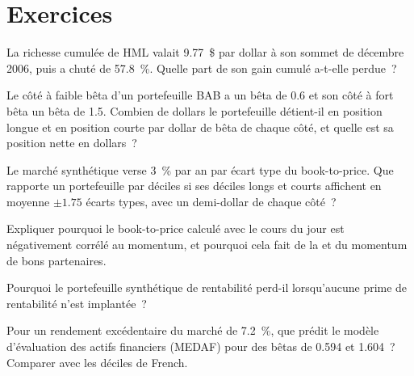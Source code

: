 \section{Exercices}

\begin{exercise}[$\star$]\label{exo:s1:value-quality-and-low-risk:1}
La richesse cumulée de HML valait 9.77~\$ par dollar à son sommet de décembre 2006, puis a chuté de 57.8~\%. Quelle part de son gain cumulé a-t-elle perdue~?
\end{exercise}

\begin{exercise}[$\star$]\label{exo:s1:value-quality-and-low-risk:2}
Le côté à faible bêta d'un portefeuille BAB a un bêta de 0.6 et son côté à fort bêta un bêta de 1.5. Combien de dollars le portefeuille détient-il en position longue et en position courte par dollar de bêta de chaque côté, et
quelle est sa position nette en dollars~?
\end{exercise}

\begin{exercise}[$\star$]\label{exo:s1:value-quality-and-low-risk:3}
Le marché synthétique verse 3~\% par an par écart type du book-to-price. Que rapporte un portefeuille par déciles si ses déciles longs et courts affichent en moyenne $\pm 1.75$
écarts types, avec un demi-dollar de chaque côté~?
\end{exercise}

\begin{exercise}[$\star\star$]\label{exo:s1:value-quality-and-low-risk:4}
Expliquer pourquoi le book-to-price calculé avec le cours du jour est négativement corrélé au momentum, et pourquoi cela fait de la  et du momentum de bons partenaires.
\end{exercise}

\begin{exercise}[$\star\star$]\label{exo:s1:value-quality-and-low-risk:5}
Pourquoi le portefeuille synthétique de rentabilité perd-il lorsqu'aucune prime de rentabilité n'est implantée~?
\end{exercise}

\begin{exercise}[$\star\star$]\label{exo:s1:value-quality-and-low-risk:6}
Pour un rendement excédentaire du marché de 7.2~\%, que prédit le modèle d'évaluation des actifs financiers (MEDAF) pour des bêtas de 0.594 et 1.604~? Comparer avec les déciles de French.
\end{exercise}

